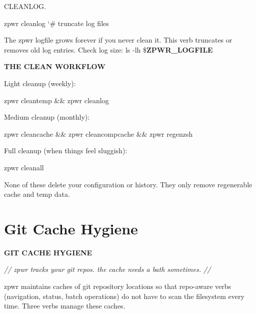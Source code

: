 \documentclass[11pt,a4paper,twoside]{book}
\begin{document}
CLEANLOG.

\begin{codebox}
\color{neongreen}zpwr cleanlog                       {\char`\#} truncate log files\\
\end{codebox}

The zpwr logfile grows forever if you never clean it. This verb truncates or removes old log entries. Check log size: ls -lh \$\textbf{ZPWR\_LOGFILE}


\vspace{12pt}
{\bfseries\color{neonyellow} THE CLEAN WORKFLOW}\vspace{4pt}

Light cleanup (weekly):

\begin{codebox}
\color{neongreen}zpwr cleantemp \&\& zpwr cleanlog\\
\end{codebox}

Medium cleanup (monthly):

\begin{codebox}
\color{neongreen}zpwr cleancache \&\& zpwr cleancompcache \&\& zpwr regenzsh\\
\end{codebox}

Full cleanup (when things feel sluggish):

\begin{codebox}
\color{neongreen}zpwr cleanall\\
\end{codebox}

None of these delete your configuration or history. They only remove regenerable cache and temp data.


\vspace{16pt}

\section{Git Cache Hygiene}


\vspace{10pt}
{\large\bfseries\color{neoncyan} GIT CACHE HYGIENE}\vspace{6pt}

{\small\itshape\color{dimtext} // zpwr tracks your git repos. the cache needs a bath sometimes. //}

zpwr maintains caches of git repository locations so that repo-aware verbs (navigation, status, batch operations) do not have to scan the filesystem every time. Three verbs manage these caches.
\end{document}
